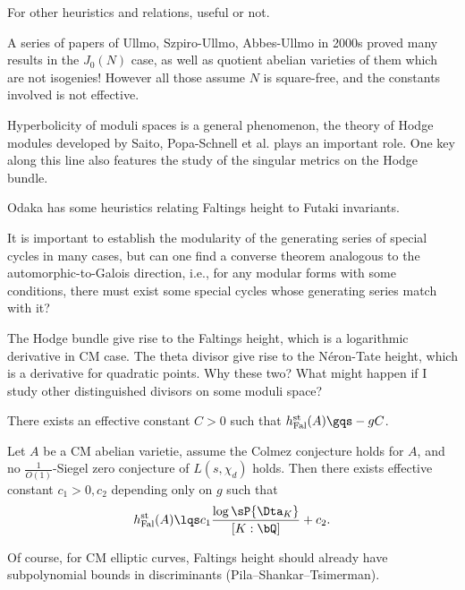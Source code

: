 \documentclass[a4paper, twoside]{article}
\begin{document}
 For other heuristics and relations, useful or not.
\begin{itm}
	\item A series of papers of Ullmo, Szpiro-Ullmo, Abbes-Ullmo in 2000s proved many results in the $J_{0}(N)$ case, as well as quotient abelian varieties of them which are not isogenies! However all those assume $N$ is square-free, and the constants involved is not effective.
	\item Hyperbolicity of moduli spaces is a general phenomenon, the theory of Hodge modules developed by Saito, Popa-Schnell et al. plays an important role. One key along this line also features the study of the singular metrics on the Hodge bundle.
	\item Odaka has some heuristics relating Faltings height to Futaki invariants.
	\item It is important to establish the modularity of the generating series of special cycles in many cases, but can one find a converse theorem analogous to the automorphic-to-Galois direction, i.e., for any modular forms with some conditions, there must exist some special cycles whose generating series match with it?
	\item The Hodge bundle give rise to the Faltings height, which is a logarithmic derivative in CM case. The theta divisor give rise to the N{\'e}ron-Tate height, which is a derivative for quadratic points. Why these two? What might happen if I study other distinguished divisors on some moduli space?
\end{itm}


\begin{thm}[Bost1996]
	There exists an effective constant $C>0$ such that $h_{\text{Fal}}^{\text{st}}(A)\gqs-gC$.
\end{thm}


\begin{thm}
	Let $A$ be a CM abelian varietie, assume the Colmez conjecture holds for $A$, and no $\frac{1}{O(1)}$-Siegel zero conjecture of $L(s,\chi_{d})$ holds. Then there exists effective constant $c_{1}>0,c_{2}$ depending only on $g$ such that
	\[
		h_{\text{Fal}}^{\text{st}}(A)\lqs c_{1}\frac{\log\sP{\Dta_{K}}}{[K:\bQ]}+c_{2}.
	\]
\end{thm}

Of course, for CM elliptic curves, Faltings height should already have subpolynomial bounds in discriminants (Pila--Shankar--Tsimerman).

\end{document}
